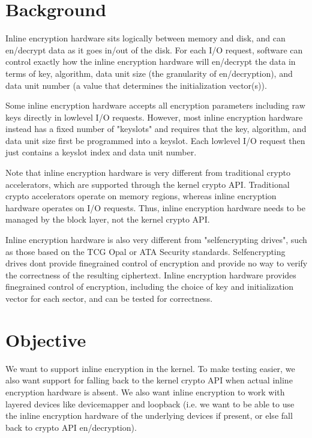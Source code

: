 \documentclass[a4paper,11pt,english]{sphinxmanual}
\begin{document}
\section{Background}
\label{\detokenize{inline-encryption:background}}
Inline encryption hardware sits logically between memory and disk, and can
en/decrypt data as it goes in/out of the disk.  For each I/O request, software
can control exactly how the inline encryption hardware will en/decrypt the data
in terms of key, algorithm, data unit size (the granularity of en/decryption),
and data unit number (a value that determines the initialization vector(s)).

Some inline encryption hardware accepts all encryption parameters including raw
keys directly in low\sphinxhyphen{}level I/O requests.  However, most inline encryption
hardware instead has a fixed number of "keyslots" and requires that the key,
algorithm, and data unit size first be programmed into a keyslot.  Each
low\sphinxhyphen{}level I/O request then just contains a keyslot index and data unit number.

Note that inline encryption hardware is very different from traditional crypto
accelerators, which are supported through the kernel crypto API.  Traditional
crypto accelerators operate on memory regions, whereas inline encryption
hardware operates on I/O requests.  Thus, inline encryption hardware needs to be
managed by the block layer, not the kernel crypto API.

Inline encryption hardware is also very different from "self\sphinxhyphen{}encrypting drives",
such as those based on the TCG Opal or ATA Security standards.  Self\sphinxhyphen{}encrypting
drives don\textquotesingle{}t provide fine\sphinxhyphen{}grained control of encryption and provide no way to
verify the correctness of the resulting ciphertext.  Inline encryption hardware
provides fine\sphinxhyphen{}grained control of encryption, including the choice of key and
initialization vector for each sector, and can be tested for correctness.


\section{Objective}
\label{\detokenize{inline-encryption:objective}}
We want to support inline encryption in the kernel.  To make testing easier, we
also want support for falling back to the kernel crypto API when actual inline
encryption hardware is absent.  We also want inline encryption to work with
layered devices like device\sphinxhyphen{}mapper and loopback (i.e. we want to be able to use
the inline encryption hardware of the underlying devices if present, or else
fall back to crypto API en/decryption).
\end{document}
